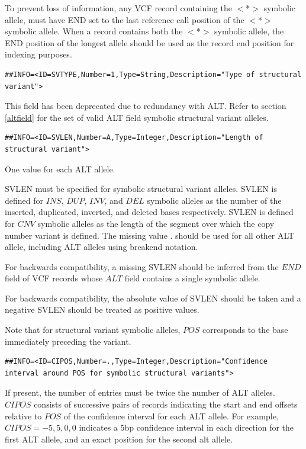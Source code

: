 \documentclass[8pt]{article}
\begin{document}
\begin{samepage}
To prevent loss of information, any VCF record containing the $<$*$>$ symbolic allele, must have END set to the last reference call position of the $<$*$>$ symbolic allele.
When a record contains both the $<$*$>$ symbolic allele, the END position of the longest allele should be used as the record end position for indexing purposes.
  
\footnotesize
\begin{verbatim}
##INFO=<ID=SVTYPE,Number=1,Type=String,Description="Type of structural variant">
\end{verbatim}
\normalsize
\end{samepage}

This field has been deprecated due to redundancy with ALT.
Refer to section \ref{altfield} for the set of valid ALT field symbolic structural variant alleles.

\footnotesize
\begin{verbatim}
##INFO=<ID=SVLEN,Number=A,Type=Integer,Description="Length of structural variant">
\end{verbatim}
\normalsize

One value for each ALT allele.

SVLEN must be specified for symbolic structural variant alleles.
SVLEN is defined for $INS$, $DUP$, $INV$, and $DEL$ symbolic alleles as the number of the inserted, duplicated, inverted, and deleted bases respectively.
SVLEN is defined for $CNV$ symbolic alleles as the length of the segment over which the copy number variant is defined.
The missing value $.$ should be used for all other ALT allele, including ALT alleles using breakend notation.

For backwards compatibility, a missing SVLEN should be inferred from the $END$ field of VCF records whose $ALT$ field contains a single symbolic allele.

For backwards compatibility, the absolute value of SVLEN should be taken and a negative SVLEN should be treated as positive values.

Note that for structural variant symbolic alleles, $POS$ corresponds to the base immediately preceding the variant.

\footnotesize
\begin{verbatim}
##INFO=<ID=CIPOS,Number=.,Type=Integer,Description="Confidence interval around POS for symbolic structural variants">
\end{verbatim}
\normalsize

If present, the number of entries must be twice the number of ALT alleles.
$CIPOS$ consists of successive pairs of records indicating the start and end offsets relative to $POS$ of the confidence interval for each ALT allele.
For example, $CIPOS=-5,5,0,0$ indicates a 5bp confidence interval in each direction for the first ALT allele, and an exact position for the second alt allele.
\end{document}
